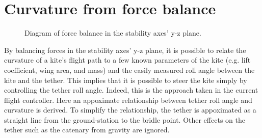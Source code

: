 \documentclass{article} %
\newcommand{\cw}{\mathrm{cw}}
\begin{document}
\section{Curvature from force balance}

\begin{figure}[h]
\begin{center}
  \caption{Diagram of force balance in the stability axes' y-z plane.}
\end{center}
\end{figure}

By balancing forces in the stability axes' y-z plane, it is possible
to relate the curvature of a kite's flight path to a few known
parameters of the kite (e.g. lift coefficient, wing area, and mass)
and the easily measured roll angle between the kite and the tether.
This implies that it is possible to steer the kite simply by
controlling the tether roll angle.  Indeed, this is the approach taken
in the current flight controller.  Here an appoximate relationship
between tether roll angle and curvature is derived.  To simplify the
relationship, the tether is appoximated as a straight line from the
ground-station to the bridle point.  Other effects on the tether such
as the catenary from gravity are ignored.
\end{document}
